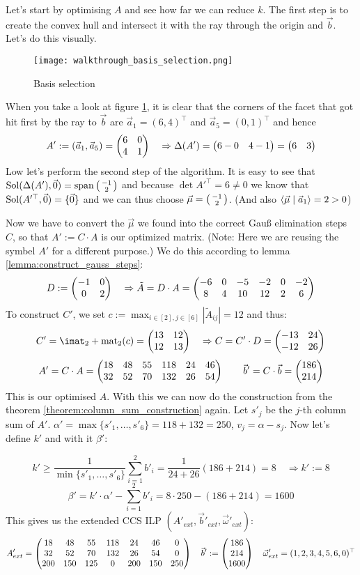 Let's start by optimising $A$ and see how far we can reduce $k$. The first step is to create the convex hull and intersect it with the ray through the origin and $\vec b$. Let's do this visually.
\begin{figure}
    \centering
    \texttt{[image: walkthrough\_basis\_selection.png]}
    \caption{\label{fig:walkthrough_basis_selection} Basis selection }
\end{figure}
When you take a look at figure \ref{fig:walkthrough_basis_selection}, it is clear that the corners of the facet that got hit first by the ray to $\vec b$ are $\vec a_1 = (6, 4)^\top$ and $\vec a_5 = (0, 1)^\top$ and hence
$$A' := (\vec a_1, \vec a_5) = \left(\begin{matrix}6&0\\4&1\end{matrix}\right) \quad \Rightarrow \Delta(A') = \left(\begin{matrix}6-0&4-1\end{matrix}\right) = \left(\begin{matrix}6&3\end{matrix}\right)$$
Low let's perform the second step of the algorithm. It is easy to see that $\operatorname{Sol}(\Delta(A'), \vec 0) = \operatorname{span}\left(\begin{smallmatrix}-1\\2\end{smallmatrix}\right)$ and because $\det A'^\top = 6 \neq 0$ we know that $\operatorname{Sol}(A'^\top, \vec 0) = \{\vec 0\}$ and we can thus choose $\vec\mu = \left(\begin{smallmatrix}-1\\2\end{smallmatrix}\right)$. (And also $\langle \vec\mu \mid \vec a_1 \rangle = 2 > 0$)

Now we have to convert the $\vec\mu$ we found into the correct Gauß elimination steps $C$, so that $A' := C\cdot A$ is our optimized matrix. (Note: Here we are reusing the symbel $A'$ for a different purpose.) We do this according to lemma \ref{lemma:construct_gauss_steps}:
$$D := \left(\begin{matrix}-1&0\\0&2\end{matrix}\right) \quad\Rightarrow \tilde A = D \cdot A = \left(\begin{matrix}-6&0&-5&-2&0&-2\\8&4&10&12&2&6\end{matrix}\right)$$
To construct $C'$, we set $c := \max_{i\in[2], j\in[6]}|\tilde A_{ij}| = 12$ and thus:
$$C' = \imat_2 + \opmat_2(c) = \mat{13&12\\12&13} \quad\Rightarrow C = C'\cdot D = \mat{-13&24\\-12&26}$$
$$A' = C \cdot A = \left(\begin{matrix}18&48&55&118&24&46\\32&52&70&132&26&54\end{matrix}\right)\qquad \vec b' = C\cdot \vec b = \left(\begin{matrix}186\\214\end{matrix}\right)$$
This is our optimised $A$. With this we can now do the construction from the theorem \ref{theorem:column_sum_construction} again. Let $s'_j$ be the $j$-th column sum of $A'$. $\alpha' = \max\{s'_1, \dots, s'_6\} = 118+132=250$, $v_j = \alpha - s_j$. Now let's define $k'$ and with it $\beta'$:

$$k' \geq \frac{1}{\min\{s'_1, \dots, s'_6\}} \sum_{i=1}^{2}b'_i = \frac{1}{24+26}(186+214) = 8 \quad \Rightarrow k' := 8$$ 
$$\beta' = k'\cdot\alpha' - \sum_{i=1}^{2}b'_i = 8\cdot250-(186+214) = 1600$$
This gives us the extended CCS ILP $(A'_{ext}, \vec b'_{ext}, \vec\omega'_{ext})$:
$$A'_{ext} = \left(\begin{matrix}18&48&55&118&24&46&0\\32&52&70&132&26&54&0\\200&150&125&0&200&150&250\end{matrix}\right)\quad\vec b':= \left(\begin{matrix}186\\214\\1600\end{matrix}\right)\quad \vec\omega'_{ext} = (1, 2, 3, 4, 5, 6, 0)^\top$$

